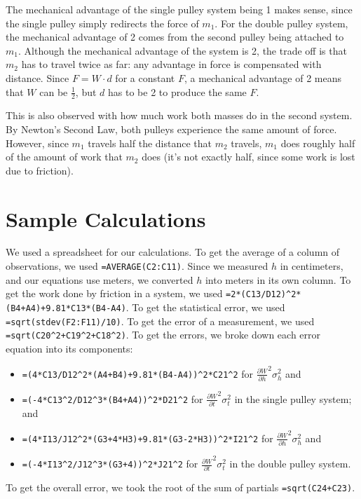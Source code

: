 \documentclass[12pt]{article}
\begin{document}
The mechanical advantage of the single pulley system being 1 makes sense, since the single pulley simply redirects the force of \(m_1\). For the double pulley system, the mechanical advantage of 2 comes from the second pulley being attached to \(m_1\). Although the mechanical advantage of the system is 2, the trade off is that \(m_2\) has to travel twice as far: any advantage in force is compensated with distance. Since \(F = W \cdot d\) for a constant \(F\), a mechanical advantage of 2 means that \(W\) can be \(\frac{1}{2}\), but \(d\) has to be 2 to produce the same \(F\).

This is also observed with how much work both masses do in the second system. By Newton's Second Law, both pulleys experience the same amount of force. However, since \(m_1\) travels half the distance that \(m_2\) travels, \(m_1\) does roughly half of the amount of work that \(m_2\) does (it's not exactly half, since some work is lost due to friction).
\section{Sample Calculations}
\label{sec:org17256c8}

We used a spreadsheet for our calculations. To get the average of a column of observations, we used \texttt{=AVERAGE(C2:C11)}. Since we measured \(h\) in centimeters, and our equations use meters, we converted \(h\) into meters in its own column. To get the work done by friction in a system, we used \texttt{=2*(C13/D12)\textasciicircum{}2*(B4+A4)+9.81*C13*(B4-A4)}. To get the statistical error, we used \texttt{=sqrt(stdev(F2:F11)/10)}. To get the error of a measurement, we used \texttt{=sqrt(C20\textasciicircum{}2+C19\textasciicircum{}2+C18\textasciicircum{}2)}. To get the errors, we broke down each error equation into its components:

\begin{itemize}
\item \verb|=(4*C13/D12^2*(A4+B4)+9.81*(B4-A4))^2*C21^2| for \(\frac{\partial W}{\partial h}^2 \sigma_h^{2}\) and
\item \verb|=(-4*C13^2/D12^3*(B4+A4))^2*D21^2| for \(\frac{\partial W}{\partial t}^{2} \sigma_t^{2}\) in the single pulley system; and
\item \verb|=(4*I13/J12^2*(G3+4*H3)+9.81*(G3-2*H3))^2*I21^2| for \(\frac{\partial W}{\partial h}^{2} \sigma_h^{2}\) and
\item \verb|=(-4*I13^2/J12^3*(G3+4))^2*J21^2| for \(\frac{\partial W}{\partial t}^{2} \sigma_t^{2}\) in the double pulley system.
\end{itemize}
To get the overall error, we took the root of the sum of partials \texttt{=sqrt(C24+C23)}.
\end{document}
